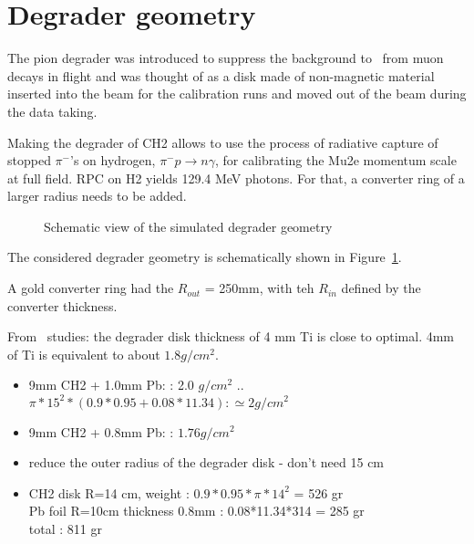 \section{Degrader geometry}

The pion degrader was introduced to suppress the background to \piplusenu\
from muon decays in flight and was thought of as a disk made of non-magnetic material
inserted into the beam for the calibration runs and moved out of the beam
during the data taking.

Making the degrader of CH2 allows to use the process of radiative capture of
stopped $\pi^-$'s on hydrogen, $\pi^-p \to n\gamma$, for calibrating the Mu2e momentum scale
at full field. RPC on H2 yields 129.4 MeV photons. For that, a converter ring of a larger radius needs to be added.

\begin{figure}[H]
  \caption{
    \label{figure:degrader_geometry_001}
    Schematic view of the simulated degrader geometry
  }
\end{figure}

The considered degrader geometry is schematically shown in Figure~\ref{figure:degrader_geometry_001}.

A gold converter ring had the $R_{out}$ = 250mm, with teh $R_{in}$ defined by the converter thickness.

From \piplusenu\ studies: the degrader disk thickness of 4 mm Ti is close to optimal.
4mm of Ti is equivalent to about $1.8 g/cm^2$.
\begin{itemize}
\item
  9mm CH2 + 1.0mm Pb: : 2.0 $g/cm^2$   .. $\pi*15^2*(0.9*0.95 + 0.08*11.34): \simeq 2 g/cm^2$
\item
   9mm CH2 + 0.8mm Pb: : $1.76 g/cm^2$
 \item
   reduce the outer radius of the degrader disk - don't need 15 cm
 \item
   CH2 disk R=14 cm, weight        : $0.9*0.95*\pi*14^2$ = 526 gr \\
   Pb  foil R=10cm thickness 0.8mm : 0.08*11.34*314    = 285 gr \\
   total                           : 811 gr
\end{itemize}

